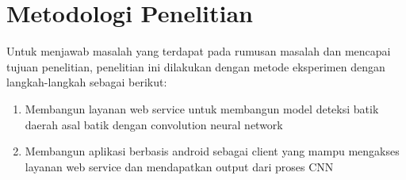

\section{Metodologi Penelitian}
Untuk menjawab masalah yang terdapat pada rumusan masalah dan mencapai tujuan penelitian, penelitian ini dilakukan dengan metode eksperimen dengan langkah-langkah sebagai berikut:
\begin{enumerate}
	\item Membangun layanan web service untuk membangun model deteksi batik daerah asal batik dengan convolution neural network
	\item Membangun aplikasi berbasis android sebagai client yang mampu mengakses layanan web service dan mendapatkan output dari proses CNN
\end{enumerate}

